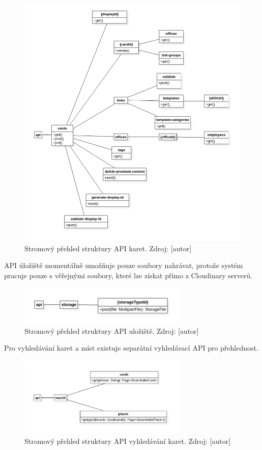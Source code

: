 		\begin{figure}[H]
			\centering
			\includegraphics[width=\linewidth]{obrazky/api_model_karty}\hfill
			\caption{Stromový přehled struktury API karet. Zdroj: [autor]}
		\end{figure}

		\ac{API} úložiště momentálně umožňuje pouze soubory nahrávat, protože systém pracuje pouze s věřejnými soubory, které
		lze získat přímo z Cloudinary serverů.

		\begin{figure}[H]
			\centering
			\includegraphics[width=8cm]{obrazky/api_model_uloziste}\hfill
			\caption{Stromový přehled struktury API uložiště. Zdroj: [autor]}
		\end{figure}

		Pro vyhledávání karet a míst existuje separátní vyhledávací \ac{API} pro přehlednost.

		\begin{figure}[H]
			\centering
			\includegraphics[width=8cm]{obrazky/api_model_vyhledavani}\hfill
			\caption{Stromový přehled struktury API vyhledávání karet. Zdroj: [autor]}
		\end{figure}

